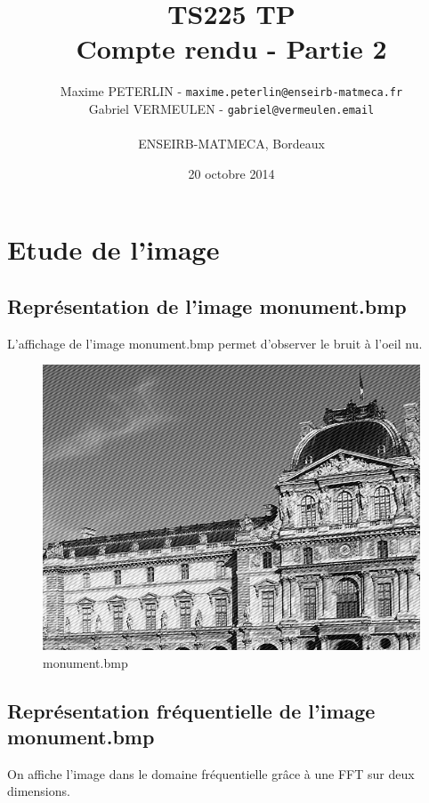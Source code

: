 \documentclass[11pt]{article}
\title{\textbf{TS225 TP}\\Compte rendu - Partie 2}
\author{Maxime PETERLIN - \texttt{maxime.peterlin@enseirb-matmeca.fr}\\
Gabriel VERMEULEN - \texttt{gabriel@vermeulen.email} \\\\{ENSEIRB-MATMECA, Bordeaux}}
\date{20 octobre 2014}
\begin{document}
\maketitle
\tableofcontents

\newpage

\section{Etude de l'image}

	\subsection{Représentation de l'image monument.bmp}

		L'affichage de l'image monument.bmp permet d'observer le bruit à l'oeil nu.

		\begin{figure}[h]
			\centering
			\includegraphics[scale=0.6]{img/monument.png}
			\caption{monument.bmp}
			\label{img1}
		\end{figure}

	\subsection{Représentation fréquentielle de l'image monument.bmp}

		On affiche l'image dans le domaine fréquentielle grâce à une FFT sur deux dimensions.
		
\end{document}

